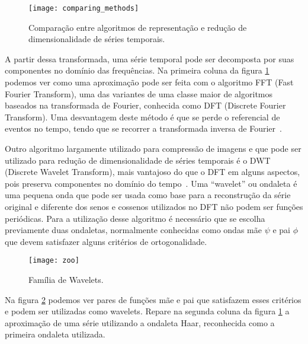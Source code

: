   \begin{figure}[htb!]
    \begin{center}
      \texttt{[image: comparing\_methods]}
      \centering
      \caption[Comparação entre algoritmos de representação.]{Comparação entre algoritmos de representação e redução de dimensionalidade de séries temporais.}
    \label{fig:comparing-methods}
    \end{center}
  \end{figure}

A partir dessa transformada, uma série temporal pode ser decomposta por suas componentes no domínio das frequências. Na primeira coluna da figura \ref{fig:comparing-methods} podemos ver como uma aproximação pode ser feita com o algoritmo FFT (Fast Fourier Transform), uma das variantes de uma classe maior de algoritmos baseados na transformada de Fourier, conhecida como DFT (Discrete Fourier Transform). Uma desvantagem deste método é que se perde o referencial de eventos no tempo, tendo que se recorrer a transformada inversa de Fourier~\cite{dftandwavelets}.

Outro algoritmo largamente utilizado para compressão de imagens e que pode ser utilizado para redução de dimensionalidade de séries temporais é o DWT (Discrete Wavelet Transform), mais vantajoso do que o DFT em alguns aspectos, pois preserva componentes no domínio do tempo~\cite{insightintowavelets}. Uma ``wavelet'' ou ondaleta é uma pequena onda que pode ser usada como base para a reconstrução da série original e diferente dos senos e cossenos utilizados no DFT não podem ser funções periódicas. Para a utilização desse algoritmo é necessário que se escolha previamente duas ondaletas, normalmente conhecidas como ondas mãe $\psi$ e pai $\phi$ que devem satisfazer alguns critérios de ortogonalidade. 

  \begin{figure}[htb!]
    \begin{center}
      \texttt{[image: zoo]}
      \centering
      \caption{Família de Wavelets.}
    \label{fig:zoo}
    \end{center}
  \end{figure}



Na figura \ref{fig:zoo} podemos ver pares de funções mãe e pai que satisfazem esses critérios e podem ser utilizadas como wavelets. Repare na segunda coluna da figura \ref{fig:comparing-methods} a aproximação de uma série utilizando a ondaleta Haar, reconhecida como a primeira ondaleta utilizada.

